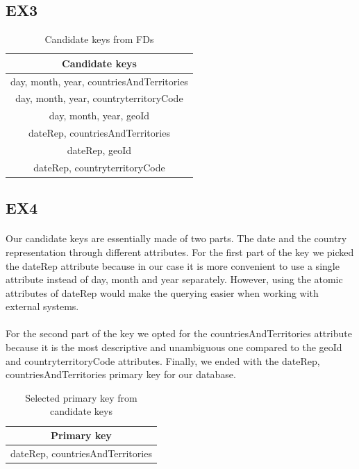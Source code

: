 \documentclass[12pt,oneside,a4paper,english]{article}
\begin{document}
\subsection{EX3}
\begin{table}[h]
 \caption{Candidate keys from FDs}
 \centering 
 \begin{tabular}{|c|} %
  \hline %
  \textbf{Candidate keys} \\ [1ex]
  \hline %
  day, month, year, countriesAndTerritories\\ [1ex] 
  day, month, year, countryterritoryCode\\ [1ex]
  day, month, year, geoId\\ [1ex]
  dateRep, countriesAndTerritories\\ [1ex]
  dateRep, geoId\\ [1ex]
  dateRep, countryterritoryCode\\ [1ex]
  \hline
 \end{tabular}
\end{table}

\subsection{EX4}
\raggedright
\paragraph{} Our candidate keys are essentially made of two parts. The date and the country representation through different attributes. For the first part of the key we picked the dateRep attribute because in our case it is more convenient to use a single attribute instead of day, month and year separately. However, using the atomic attributes of dateRep would make the querying easier when working with external systems.
\paragraph{} For the second part of the key we opted for the countriesAndTerritories attribute because it is the most descriptive and unambiguous one compared to the geoId and countryterritoryCode attributes. Finally, we ended with the dateRep, countriesAndTerritories primary key for our database.

\begin{table}[h]
 \caption{Selected primary key from candidate keys}
 \centering 
 \begin{tabular}{|c|} %
  \hline %
  \textbf{Primary key} \\ [1ex]
  \hline %
  dateRep, countriesAndTerritories\\ [1ex] 
  \hline
 \end{tabular}
\end{table}
\end{document}
